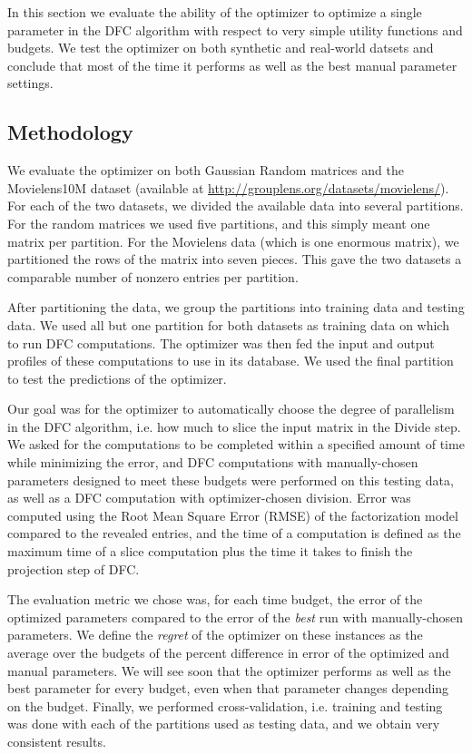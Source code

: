
In this section we evaluate the ability of the optimizer to optimize a single parameter in the DFC algorithm with respect to very simple utility functions and budgets. We test the optimizer on both synthetic and real-world datsets and conclude that most of the time it performs as well as the best manual parameter settings. 

\subsection{Methodology}

We evaluate the optimizer on both Gaussian Random matrices and the Movielens10M dataset (available at \url{http://grouplens.org/datasets/movielens/}). For each of the two datasets, we divided the available data into several partitions. For the random matrices we used five partitions, and this simply meant one matrix per partition. For the Movielens data (which is one enormous matrix), we partitioned the rows of the matrix into seven pieces. This gave the two datasets a comparable number of nonzero entries per partition. 

After partitioning the data, we group the partitions into training data and testing data. We used all but one partition for both datasets as training data on which to run DFC computations. The optimizer was then fed the input and output profiles of these computations to use in its database. We used the final partition to test the predictions of the optimizer. 

Our goal was for the optimizer to automatically choose the degree of parallelism in the DFC algorithm, i.e. how much to slice the input matrix in the Divide step. We asked for the computations to be completed within a specified amount of time while minimizing the error, and DFC computations with manually-chosen parameters designed to meet these budgets were performed on this testing data, as well as a DFC computation with optimizer-chosen division. Error was computed using the Root Mean Square Error (RMSE) of the factorization model compared to the revealed entries, and the time of a computation is defined as the maximum time of a slice computation plus the time it takes to finish the projection step of DFC.  

The evaluation metric we chose was, for each time budget, the error of the optimized parameters compared to the error of the \emph{best} run with manually-chosen parameters. We define the \emph{regret} of the optimizer on these instances as the average over the budgets of the percent difference in error of the optimized and manual parameters. We will see soon that the optimizer performs as well as the best parameter for every budget, even when that parameter changes depending on the budget. Finally, we performed cross-validation, i.e. training and testing was done with each of the partitions used as testing data, and we obtain very consistent results. 

